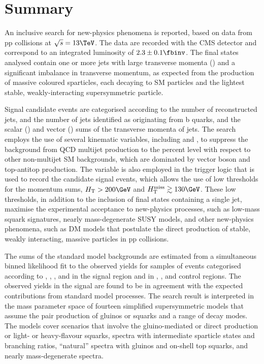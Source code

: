 \section{Summary}
\label{sec:summary}

An inclusive search for new-physics phenomena is reported, based on
data from pp collisions at $\sqrt{s} = 13\TeV$. The data are recorded
with the CMS detector and correspond to an integrated luminosity of
$2.3 \pm 0.1 \fbinv$. The final states analysed contain one or more
jets with large transverse momenta (\Pt) and a significant imbalance
in transverse momentum, as expected from the production of massive
coloured sparticles, each decaying to SM particles and the lightest
stable, weakly-interacting supersymmetric particle.

Signal candidate events are categorised according to the number of
reconstructed jets, and the number of jets identified as originating
from b quarks, and the scalar (\scalht) and vector (\HTmiss) sums of
the transverse momenta of jets.  The search employs the use of several
kinematic variables, including \alphat and \bdphi, to suppress the
background from QCD multijet production to the percent level with
respect to other non-multijet SM backgrounds, which are dominated by
vector boson and top-antitop production. The \alphat variable is also
employed in the trigger logic that is used to record the candidate
signal events, which allows the use of low thresholds for the momentum
sums, $\scalht > 200\GeV$ and $\HTmiss \gtrsim 130\GeV$. These low
thresholds, in addition to the inclusion of final states containing a
single jet, maximise the experimental acceptance to new-physics
processes, such as low-mass squark signatures, nearly mass-degenerate
SUSY models, and other new-physics phenomena, such as DM models that
postulate the direct production of stable, weakly interacting, massive
particles in pp collisions.

The sums of the standard model backgrounds are estimated from a
simultaneous binned likelihood fit to the observed yields for samples
of events categorised according to \njet, \nb, \scalht, and \HTmiss in
the signal region and in \mj, \mmj, and \gj control regions. The
observed yields in the signal are found to be in agreement with the
expected contributions from standard model processes.  The search
result is interpreted in the mass parameter space of fourteen 
simplified supersymmetric models that assume the pair production of
gluinos or squarks and a range of decay modes. The models cover
scenarios that involve the gluino-mediated or direct production or
light- or heavy-flavour squarks, spectra with intermediate sparticle
states and branching ratios, ``natural'' spectra with gluinos and
on-shell top squarks, and nearly mass-degenerate spectra.

